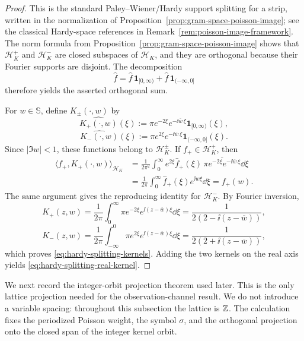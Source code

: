 \begin{proof}
This is the standard Paley--Wiener/Hardy support splitting for a strip,
written in the normalization of Proposition~\ref{prop:gram-space-poisson-image};
see the classical Hardy-space references in
Remark~\ref{rem:poisson-image-framework}.
The norm formula from Proposition~\ref{prop:gram-space-poisson-image}
shows that $\mathcal H_K^+$ and $\mathcal H_K^-$ are closed subspaces of
$\mathcal H_K$, and they are orthogonal because their Fourier supports are
disjoint.  The decomposition
\[
\widehat f
=\widehat f\,\mathbf 1_{[0,\infty)}
+\widehat f\,\mathbf 1_{(-\infty,0]}
\]
therefore yields the asserted orthogonal sum.

For $w\in\mathbb S$, define $K_\pm(\cdot,w)$ by
\[
\widehat{K_+(\cdot,w)}(\xi)
:=
\pi e^{-2\xi}e^{-\ii\overline w\,\xi}\mathbf 1_{[0,\infty)}(\xi),
\]
\[
\widehat{K_-(\cdot,w)}(\xi)
:=
\pi e^{2\xi}e^{-\ii\overline w\,\xi}\mathbf 1_{(-\infty,0]}(\xi).
\]
Since $|\Im w|<1$, these functions belong to $\mathcal H_K^\pm$.  If
$f_+\in\mathcal H_K^+$, then
\begin{align*}
\langle f_+,K_+(\cdot,w)\rangle_{\mathcal H_K}
&=
\frac{1}{2\pi^2}\int_0^\infty
e^{2\xi}\widehat f_+(\xi)\,
\overline{\pi e^{-2\xi}e^{-\ii\overline w\,\xi}}\dd\xi \\
&=
\frac{1}{2\pi}\int_0^\infty \widehat f_+(\xi)e^{\ii w\xi}\dd\xi
=f_+(w).
\end{align*}
The same argument gives the reproducing identity for $\mathcal H_K^-$.  By
Fourier inversion,
\[
K_+(z,w)
=\frac{1}{2\pi}\int_0^\infty
\pi e^{-2\xi}e^{\ii(z-\overline w)\xi}\dd\xi
=\frac{1}{2(2-\ii(z-\overline w))},
\]
\[
K_-(z,w)
=\frac{1}{2\pi}\int_{-\infty}^0
\pi e^{2\xi}e^{\ii(z-\overline w)\xi}\dd\xi
=\frac{1}{2(2+\ii(z-\overline w))},
\]
which proves \eqref{eq:hardy-splitting-kernels}.  Adding the two kernels
on the real axis yields \eqref{eq:hardy-splitting-real-kernel}.
\end{proof}

We next record the integer-orbit projection theorem used later.  This is the
only lattice projection needed for the observation-channel result.  We do not
introduce a variable spacing: throughout this subsection the lattice is
\(\mathbb{Z}\).  The calculation fixes the periodized Poisson weight, the symbol
\(\sigma\), and the orthogonal projection onto the closed span of the integer
kernel orbit.


